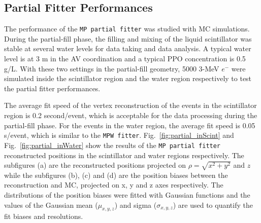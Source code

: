 \subsection{Partial Fitter Performances}
The performance of the \texttt{MP partial fitter} was studied with MC simulations. During the partial-fill phase, the filling and mixing of the liquid scintillator was stable at several water levels for data taking and data analysis. A typical water level is at 3 m in the AV coordination and a typical PPO concentration is 0.5 g/L. With these two settings in the partial-fill geometry, 5000 3-MeV $e^-$ were simulated inside the scintillator region and the water region respectively to test the partial fitter performances.

The average fit speed of the vertex reconstruction of the events in the scintillator region is 0.2 second/event, which is acceptable for the data processing during the partial-fill phase. For the events in the water region, the average fit speed is 0.05 s/event, which is similar to the \texttt{MPW fitter}. Fig.~\ref{fig:partial_inScint} and Fig.~\ref{fig:partial_inWater} show the results of the \texttt{MP partial fitter} reconstructed positions in the scintillator and water regions respectively. The subfigures (a) are the reconstructed positions projected on $\rho=\sqrt{x^2+y^2}$ and $z$ while the subfigures (b), (c) and (d) are the position biases between the reconstruction and MC, projected on x, y and z axes respectively. The distributions of the position biases were fitted with Gaussian functions and the values of the Gaussian mean ($\mu_{x,y,z}$) and sigma ($\sigma_{x,y,z}$) are used to quantify the fit biases and resolutions.

